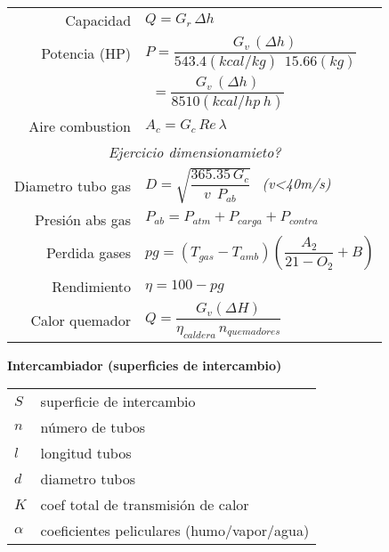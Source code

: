 \documentclass[11pt,a4paper]{article}
\begin{document}
\begin{cajita}
\begin{multicols}{2}
			\begin{tabular}{r l}
				Capacidad  & $Q=G_{r} \, \Delta h$\\
				Potencia  (HP) & $P=\dfrac{G_{v}\,\left(\Delta h\right)}{543.4(kcal/kg)~~15.66(kg)}~~$\\
				&$~~=\dfrac{G_{v}\,\left(\Delta h\right)}{8510 (kcal/hp~h)}$\\[0.4cm]
				Aire combustion& $A_{c}=G_{c}\,Re\,\lambda$\\
				\multicolumn{2}{c}{\textsl{Ejercicio dimensionamieto?}}\\
				Diametro tubo gas & $D=\sqrt{\dfrac{365.35\,G_{c}}{v~~P_{ab}}}~~$ \textit{(v<40m/s)}\\
				Presión abs gas& $P_{ab}=P_{atm}+P_{carga}+P_{contra}$\\
				Perdida gases & $pg=(T_{gas}-T_{amb})\left(\dfrac{A_{2}}{21-O_{2}}+B\right)$\\
				Rendimiento  & $ \eta=100-pg$\\
				Calor quemador& $Q=\dfrac{G_{v}(\Delta H)}{\eta_{caldera} \, n_{quemadores}}$\\
			\end{tabular}
		\end{multicols}
	
			\begin{center}
				\textbf{Intercambiador (superficies de intercambio)}
			\end{center}
	
			\begin{multicols}{2}
				\renewcommand{\arraystretch}{1}
				\begin{tabular}{@{}p{1cm}@{}@{}p{7cm}@{}}
					$S$ & superficie de intercambio\\
					$n$ & número de tubos\\
					$l$ & longitud tubos\\
					$d$& diametro tubos\\
					$K$ & coef total de transmisión de calor\\
					$\alpha$ & coeficientes peliculares \break (humo/vapor/agua)\\
				\end{tabular}
				

\end{multicols}
\end{cajita}
\end{document}

